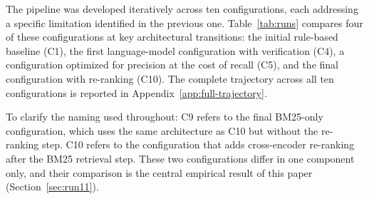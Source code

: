 \documentclass[10pt]{article}
\begin{document}
The pipeline was developed iteratively across ten configurations,
each addressing a specific limitation identified in the previous
one.
Table~\ref{tab:runs} compares four of these configurations at key
architectural transitions: the initial rule-based baseline (C1),
the first language-model configuration with verification (C4),
a configuration optimized for precision at the cost of recall (C5),
and the final configuration with re-ranking (C10).
The complete trajectory across all ten configurations is reported
in Appendix~\ref{app:full-trajectory}.

To clarify the naming used throughout: C9 refers to the final
BM25-only configuration, which uses the same architecture as C10
but without the re-ranking step.
C10 refers to the configuration that adds cross-encoder re-ranking
after the BM25 retrieval step.
These two configurations differ in one component only, and their
comparison is the central empirical result of this paper
(Section~\ref{sec:run11}).
\end{document}
